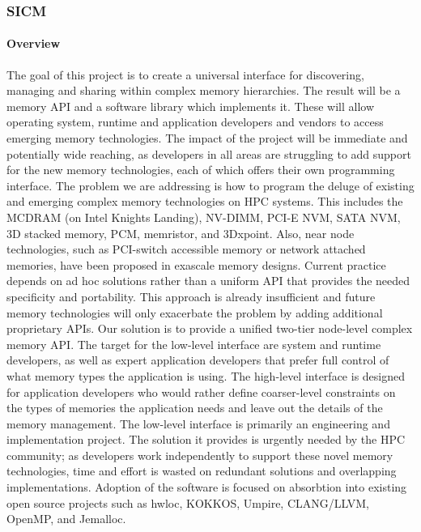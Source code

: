 \subsubsection{ SICM}
\paragraph{Overview} The goal of this project is to create a universal interface for discovering, managing and sharing within complex memory hierarchies. The result will be a memory API and a software library which implements it. These will allow operating system, runtime and application developers and vendors to access emerging memory technologies. The impact of the project will be immediate and potentially wide reaching, as developers in all areas are struggling to add support for the new memory technologies, each of which offers their own programming interface. The problem we are addressing is how to program the deluge of existing and emerging complex memory technologies on HPC systems. This includes the MCDRAM (on Intel Knights Landing), NV-DIMM, PCI-E NVM, SATA NVM, 3D stacked memory, PCM, memristor, and 3Dxpoint. Also, near node technologies, such as PCI-switch accessible memory or network attached memories, have been proposed in exascale memory designs. Current practice depends on ad hoc solutions rather than a uniform API that provides the needed specificity and portability. This approach is already insufficient and future memory technologies will only exacerbate the problem by adding additional proprietary APIs. Our solution is to provide a unified two-tier node-level complex memory API. The target for the low-level interface are system and runtime developers, as well as expert application developers that prefer full control of what memory types the application is using. The high-level interface is designed for application developers who would rather define coarser-level constraints on the types of memories the application needs and leave out the details of the memory management. The low-level interface is primarily an engineering and implementation project. The solution it provides is urgently needed by the HPC community; as developers work independently to support these novel memory technologies, time and effort is wasted on redundant solutions and overlapping implementations. Adoption of the software is focused on absorbtion into existing open source projects such as hwloc, KOKKOS, Umpire, CLANG/LLVM, OpenMP, and Jemalloc.
